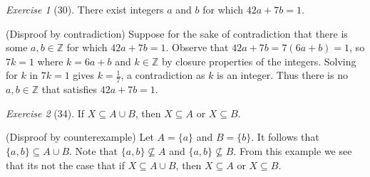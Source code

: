 \documentclass[12pt]{amsart}
\makeatletter
\theoremstyle{remark}
\newtheorem*{exercise}{Exercise}%
\def\ZZ{\ensuremath{\mathbb Z}}
\renewenvironment{proof}[1][\proofname]{\par\doublespacing
  \pushQED{\qed}%
  \normalfont \topsep6\p@\@plus6\p@\relax
  \list{}{%
    \settowidth{\leftmargin}{\itshape\proofname:\hskip\labelsep}%
    \setlength{\labelwidth}{0pt}%
    \setlength{\itemindent}{-\leftmargin}%
  }%
  \item[\hskip\labelsep\itshape#1\@addpunct{:}]\ignorespaces
}{%
  \popQED\endlist\@endpefalse
  \singlespacing
}
\theoremstyle{mycomment}
\makeatother
\begin{document}
\begin{exercise}[30] There exist integers $a$ and $b$ for which $42a+7b=1$.
\begin{proof}%
  (Disproof by contradiction) Suppose for the sake of contradiction that there is some $a,b \in \ZZ$ for which $42a+7b=1$. Observe that $42a + 7b = 7(6a + b) = 1$, so $7k =1$ where $k = 6a + b$ and $k \in \ZZ$ by closure properties of the integers. Solving for $k$ in $7k = 1$ gives $k = \frac{1}{7}$, a contradiction as $k$ is an integer. Thus there is no $a,b \in \ZZ $ that satisfies $42a + 7b = 1$.
\end{proof}
\end{exercise}

\begin{exercise}[34] If $X\subseteq A\cup B$, then $X\subseteq A$ or $X\subseteq B$.
\begin{proof}%
  (Disproof by counterexample) Let $A = \{a\}$ and $B = \{b\}$. It follows that $\{a,b\} \subseteq A \cup B$. Note that $\{a,b\} \nsubseteq A$ and $\{a,b\} \nsubseteq B$. From this example we see that its not the case that if $X\subseteq A\cup B$, then $X\subseteq A$ or $X\subseteq B$.
\end{proof}
\end{exercise}
\end{document}
